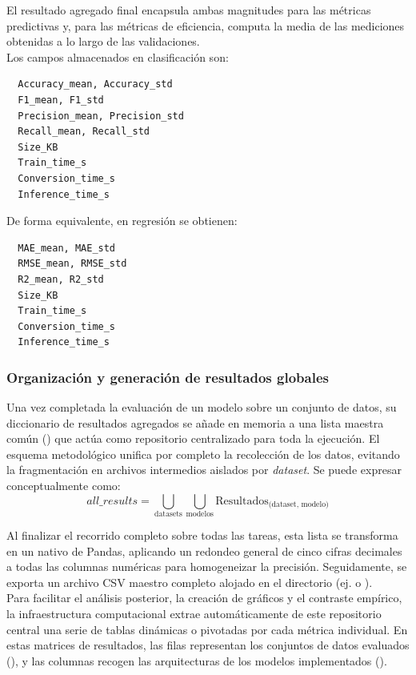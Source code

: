 \documentclass[a4paper,12pt,twoside,final]{book}
\begin{document}
El resultado agregado final encapsula ambas magnitudes para las métricas predictivas y, para las métricas de eficiencia,
computa la media de las mediciones obtenidas a lo largo de las validaciones.\\

Los campos almacenados en clasificación son:
\begin{verbatim}
  Accuracy_mean, Accuracy_std
  F1_mean, F1_std
  Precision_mean, Precision_std
  Recall_mean, Recall_std
  Size_KB
  Train_time_s
  Conversion_time_s
  Inference_time_s
\end{verbatim}

De forma equivalente, en regresión se obtienen:
\begin{verbatim}
  MAE_mean, MAE_std
  RMSE_mean, RMSE_std
  R2_mean, R2_std
  Size_KB
  Train_time_s
  Conversion_time_s
  Inference_time_s
\end{verbatim}

\subsubsection{Organización y generación de resultados globales}
Una vez completada la evaluación de un modelo sobre un conjunto de datos, su diccionario de resultados agregados se
añade en memoria a una lista maestra común () que actúa como repositorio centralizado para toda la
ejecución. El esquema metodológico unifica por completo la recolección de los datos, evitando la fragmentación en
archivos intermedios aislados por \textit{dataset}. Se puede expresar conceptualmente como:
\[
all\_results = \bigcup_{\text{datasets}} \bigcup_{\text{modelos}} \text{Resultados}_{\text{(dataset, modelo)}}
\]

Al finalizar el recorrido completo sobre todas las tareas, esta lista se transforma en un  nativo de
Pandas, aplicando un redondeo general de cinco cifras decimales a todas las columnas numéricas para homogeneizar la
precisión. Seguidamente, se exporta un archivo CSV maestro completo alojado en el directorio 
(ej.  o ).\\

Para facilitar el análisis posterior, la creación de gráficos y el contraste empírico, la infraestructura computacional
extrae automáticamente de este repositorio central una serie de tablas dinámicas o pivotadas por cada métrica
individual. En estas matrices de resultados, las filas representan los conjuntos de datos evaluados (), y
las columnas recogen las arquitecturas de los modelos implementados ().\\
\end{document}
